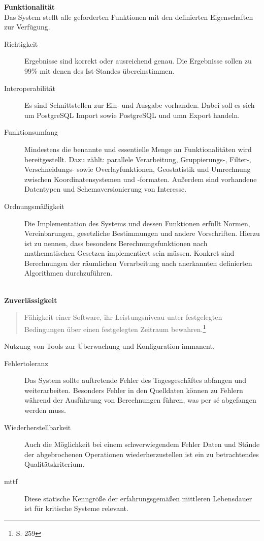 \textbf{Funktionalität}\\
Das System stellt alle geforderten Funktionen mit den definierten Eigenschaften zur Verfügung.
\begin{description}
\item[Richtigkeit] Ergebnisse sind korrekt oder ausreichend genau. Die Ergebnisse sollen zu 99\% mit denen des Ist-Standes übereinstimmen.
\item[Interoperabilität] Es sind Schnittstellen zur Ein- und Ausgabe vorhanden. Dabei soll es sich um PostgreSQL Import sowie PostgreSQL und \Gls{umn} Export handeln.
\item[Funktionsumfang] Mindestens die benannte und essentielle Menge an Funktionalitäten wird bereitgestellt. Dazu zählt:
parallele Verarbeitung, Gruppierungs-, Filter-, Verschneidungs- sowie Overlayfunktionen, Geostatistik und Umrechnung zwischen Koordinatensystemen und -formaten. Außerdem sind vorhandene Datentypen und Schemaversionierung von Interesse.
\item[Ordnungsmäßigkeit] Die Implementation des Systems und dessen Funktionen erfüllt Normen, Vereinbarungen, gesetzliche Bestimmungen und andere Vorschriften. Hierzu ist zu nennen, dass besonders Berechnungsfunktionen nach mathematischen Gesetzen implementiert sein müssen. Konkret sind Berechnungen der räumlichen Verarbeitung nach anerkannten definierten Algorithmen durchzuführen.
\end{description}
\ \\
%
\textbf{Zuverlässigkeit}
\begin{quote}
Fähigkeit einer Software, ihr Leistungsniveau unter festgelegten Bedingungen über einen festgelegten Zeitraum bewahren.\footnote{\cite{book:lehrbuchsoftware} S. 259}
\end{quote}
Nutzung von Tools zur Überwachung und Konfiguration immanent.
\begin{description}
\item[Fehlertoleranz] Das System sollte auftretende Fehler des Tagesgeschäftes abfangen und weiterarbeiten. Besonders Fehler in den Quelldaten können zu Fehlern während der Ausführung von Berechnungen führen, was per s\'{e} abgefangen werden muss.
\item[Wiederherstellbarkeit] Auch die Möglichkeit bei einem schwerwiegendem Fehler Daten und Stände der abgebrochenen Operationen wiederherzustellen ist ein zu betrachtendes Qualitätskriterium.
\item[\Gls{mttf}] Diese statische Kenngröße der erfahrungsgemäßen mittleren Lebensdauer ist für kritische Systeme relevant.
\end{description}
